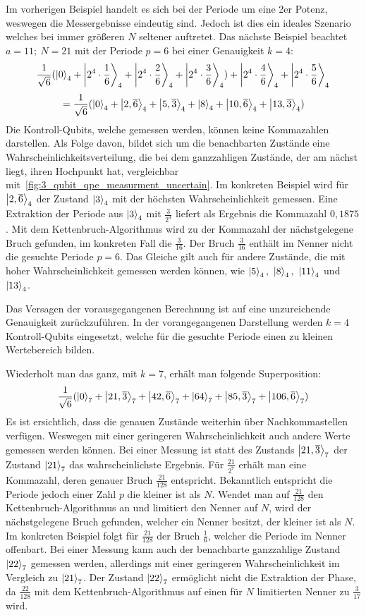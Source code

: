 Im vorherigen Beispiel handelt es sich bei der Periode um eine 2er Potenz, 
weswegen die Messergebnisse eindeutig sind.
Jedoch ist dies ein ideales Szenario welches bei immer größeren \(N\) seltener auftretet. 
Das nächste Beispiel beachtet \(a=11;~N=21\) mit der Periode \(p=6\) bei einer Genauigkeit \(k=4\):
\[\frac{1}{\sqrt{6}}(\ket{0}_4 +\ket{2^4 \cdot \frac{1}{6}}_4 + \ket{2^4 \cdot \frac{2}{6}}_4+
\ket{2^4 \cdot \frac{3}{6}}_4)+\ket{2^4 \cdot \frac{4}{6}}_4 + \ket{2^4 \cdot \frac{5}{6}}_4 \]
\[= \frac{1}{\sqrt{6}}(\ket{0}_4 +\ket{2,\overline{6}}_4 + \ket{5,\overline{3}}_4+
\ket{8}_4+\ket{10,\overline{6}}_4 + \ket{13,\overline{3}}_4) \]
Die Kontroll-Qubits, welche gemessen werden, 
können keine Kommazahlen darstellen.
Als Folge davon, bildet sich um die benachbarten Zustände eine Wahrscheinlichkeitsverteilung, 
die bei dem ganzzahligen Zustände, der am nächst liegt, ihren Hochpunkt hat,
vergleichbar mit~\ref{fig:3_qubit_qpe_measurment_uncertain}.
Im konkreten Beispiel wird für \(\ket{2,\overline{6}}_4\) der Zustand \(\ket{3}_4\) 
mit der höchsten Wahrscheinlichkeit gemessen.
Eine Extraktion der Periode aus \(\ket{3}_4\)  mit \(\frac{3}{2^4}\) liefert als Ergebnis die Kommazahl \(0,1875\).
Mit dem Kettenbruch-Algorithmus wird zu der Kommazahl der nächstgelegene Bruch gefunden, 
im konkreten Fall die \(\frac{3}{16}\).
Der Bruch \(\frac{3}{16}\) enthält im Nenner nicht die gesuchte Periode \(p=6\). 
Das Gleiche gilt auch für andere Zustände, 
die mit hoher Wahrscheinlichkeit gemessen werden können, wie 
\(\ket{5}_4,~\ket{8}_4,~\ket{11}_4\) und \(\ket{13}_4\).

Das Versagen der vorausgegangenen Berechnung ist auf eine unzureichende Genauigkeit zurückzuführen. 
In der vorangegangenen Darstellung werden \(k=4\) Kontroll-Qubits eingesetzt, 
welche für die gesuchte Periode einen zu kleinen Wertebereich bilden.

Wiederholt man das ganz, mit \(k=7\), erhält man folgende Superposition:
\[\frac{1}{\sqrt{6}}(\ket{0}_7 +\ket{21,\overline{3}}_7 + \ket{42,\overline{6}}_7+
\ket{64}_7+\ket{85,\overline{3}}_7 + \ket{106,\overline{6}}_7) \]
Es ist ersichtlich, dass die genauen Zustände weiterhin über Nachkommastellen verfügen.
Weswegen mit einer geringeren Wahrscheinlichkeit auch andere Werte gemessen werden können.
Bei einer Messung ist statt des Zustands \(\ket{21,\overline{3}}_7\) der Zustand \(\ket{21}_7\) das wahrscheinlichste Ergebnis.
Für \(\frac{21}{2^{7}}\) erhält man eine Kommazahl, deren genauer Bruch \(\frac{21}{128}\) entspricht.
Bekanntlich entspricht die Periode jedoch einer Zahl \(p\) die kleiner ist als \(N\).
Wendet man auf \(\frac{21}{128}\) den Kettenbruch-Algorithmus an und limitiert den Nenner auf \(N\), 
wird der nächstgelegene Bruch gefunden, welcher ein Nenner besitzt, der kleiner ist als \(N\).
Im konkreten Beispiel folgt für \(\frac{21}{128}\) der Bruch \(\frac{1}{6}\), 
welcher die Periode im Nenner offenbart.
Bei einer Messung kann auch der benachbarte ganzzahlige Zustand \(\ket{22}_7\) gemessen werden, 
allerdings mit einer geringeren Wahrscheinlichkeit im Vergleich zu \(\ket{21}_7\).
Der Zustand \(\ket{22}_7\) ermöglicht nicht die Extraktion der Phase, 
da \(\frac{22}{128}\) mit dem Kettenbruch-Algorithmus auf einen für \(N\) limitierten Nenner
zu \(\frac{3}{17}\) wird.

